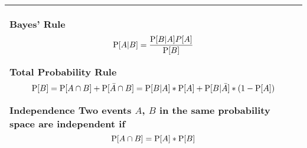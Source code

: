 {\tabulinesep=1mm
\begin{tabu}{|p{16cm} |}
\hline
\vspace{2 mm}
\textbf{Bayes' Rule} 
\[ \P[A|B] = \frac{\P[B|A]P[A]}{\P[B]} \]

\textbf{Total Probability Rule}
\[ \P[B] = \P[A \cap B] + \P[ \bar{A} \cap B] = \P[B|A] * \P[A] + 
\P[B|\bar{A}]*(1 - \P[A])\]

\textbf{Independence} \newline 
Two events $A$, $B$ in the same probability space are independent if 
\[\P[A \cap B] = \P[A] * \P[B] \]
\\
\hline
\end{tabu}
}
